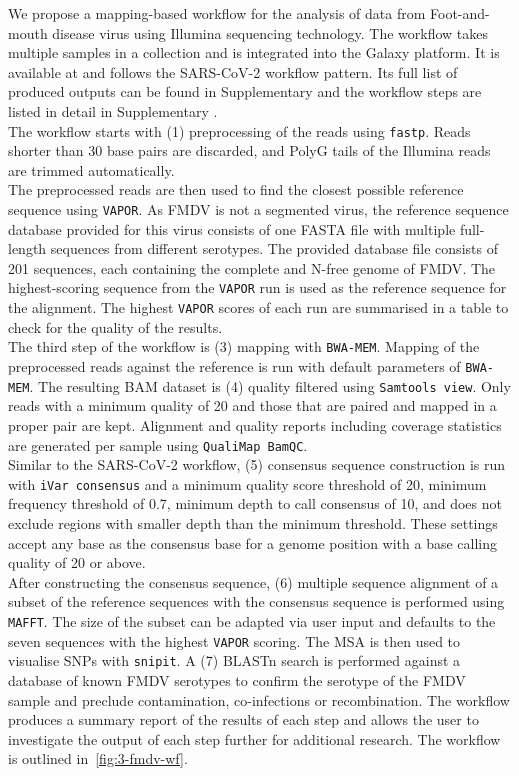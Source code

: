 We propose a mapping-based workflow for the analysis of data from Foot-and-mouth disease virus using Illumina sequencing technology. The workflow takes multiple samples in a collection and is integrated into the Galaxy platform. It is available at  and follows the \ac{SARS-CoV-2} workflow pattern. Its full list of produced outputs can be found in Supplementary  and the workflow steps are listed in detail in Supplementary . \\
The workflow starts with (1) preprocessing of the reads using \texttt{fastp}. Reads shorter than 30 base pairs are discarded, and PolyG tails of the Illumina reads are trimmed automatically. \\
The preprocessed reads are then used to find the closest possible reference sequence using \texttt{VAPOR}. As \ac{FMDV} is not a segmented virus, the reference sequence database provided for this virus consists of one FASTA file with multiple full-length sequences from different serotypes. The provided database file consists of 201 sequences, each containing the complete and N-free genome of \ac{FMDV}. The highest-scoring sequence from the \texttt{VAPOR} run is used as the reference sequence for the alignment. The highest \texttt{VAPOR} scores of each run are summarised in a table to check for the quality of the results. \\
The third step of the workflow is (3) mapping with \texttt{BWA-MEM}. Mapping of the preprocessed reads against the reference is run with default parameters of \texttt{BWA-MEM}. The resulting \ac{BAM} dataset is (4) quality filtered using \texttt{Samtools view}. Only reads with a minimum quality of 20 and those that are paired and mapped in a proper pair are kept. Alignment and quality reports including coverage statistics are generated per sample using \texttt{QualiMap BamQC}. \\
Similar to the \ac{SARS-CoV-2} workflow, (5) consensus sequence construction is run with \texttt{iVar consensus} and a minimum quality score threshold of 20, minimum frequency threshold of 0.7, minimum depth to call consensus of 10, and does not exclude regions with smaller depth than the minimum threshold. These settings accept any base as the consensus base for a genome position with a base calling quality of 20 or above. \\
After constructing the consensus sequence, (6) multiple sequence alignment of a subset of the reference sequences with the consensus sequence is performed using \texttt{MAFFT}. The size of the subset can be adapted via user input and defaults to the seven sequences with the highest \texttt{VAPOR} scoring. The \ac{MSA} is then used to visualise SNPs with \texttt{snipit}. A (7) BLASTn search is performed against a database of known FMDV serotypes to confirm the serotype of the FMDV sample and preclude contamination, co-infections or recombination. The workflow produces a summary report of the results of each step and allows the user to investigate the output of each step further for additional research. The workflow is outlined in~\ref{fig:3-fmdv-wf}.
